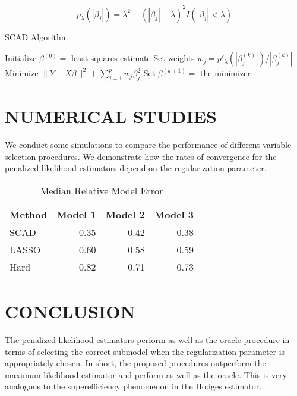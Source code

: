\documentclass[8pt,twocolumn]{article}
\begin{document}
\begin{equation}
  \label{eq:example}
  p_{\lambda}(|\beta_j|) = \lambda^2 - (|\beta_j| - \lambda)^2 I(|\beta_j| < \lambda)
\end{equation}

\begin{algorithm}
  \caption{SCAD Algorithm}
  \label{alg:scad}
  \begin{algorithmic}[1]
    \State Initialize $\beta^{(0)} = $ least squares estimate
      \State Set weights $w_j = p'_{\lambda}(|\beta_j^{(k)}|)/|\beta_j^{(k)}|$
      \State Minimize $\|Y - X\beta\|^2 + \sum_{j=1}^p w_j \beta_j^2$
      \State Set $\beta^{(k+1)} = $ the minimizer
    \EndFor
  \end{algorithmic}
\end{algorithm}

\section{NUMERICAL STUDIES}

We conduct some simulations to compare the performance of different variable selection procedures. We demonstrate how the rates of convergence for the penalized likelihood estimators depend on the regularization parameter.

\begin{table}[ht]
  \centering
  \caption{Median Relative Model Error}
  \label{tab:example}
  \begin{tabular}{@{}lrrr@{}}
    \toprule
    Method & Model 1 & Model 2 & Model 3 \\
    \midrule
    SCAD & 0.35 & 0.42 & 0.38 \\
    LASSO & 0.60 & 0.58 & 0.59 \\
    Hard & 0.82 & 0.71 & 0.73 \\
    \bottomrule
  \end{tabular}
\end{table}

\section{CONCLUSION}

The penalized likelihood estimators perform as well as the oracle procedure in terms of selecting the correct submodel when the regularization parameter is appropriately chosen. In short, the proposed procedures outperform the maximum likelihood estimator and perform as well as the oracle. This is very analogous to the superefficiency phenomenon in the Hodges estimator.


\end{document}
